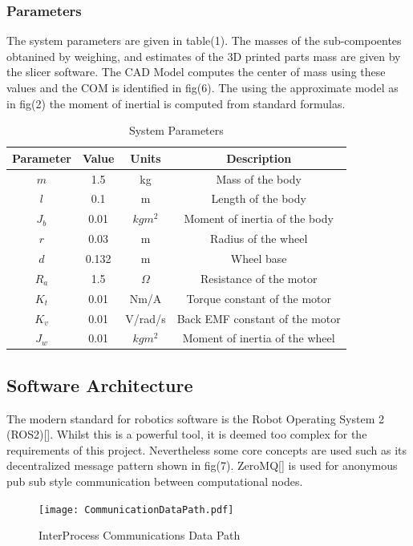         \pagebreak{}
        \subsubsection{Parameters }
        The system parameters are given in table(1). 
        The masses of the sub-compoentes obtanined by weighing,
        and estimates of the 3D printed parts mass are given by the slicer software. 
        The CAD Model computes the center of mass using these values and the COM is identified in fig(6).
        The using the approximate model as in fig(2) the moment of inertial is computed from standard formulas.
        \begin{table} [H]
            \centering
            \begin{tabular}{|c|c|c|c|}
                \hline
                Parameter & Value & Units & Description \\
                \hline
                $m$ & 1.5 & kg & Mass of the body \\
                $l$ & 0.1 & m & Length of the body \\
                $J_b$ & 0.01 & $kgm^2$ & Moment of inertia of the body \\
                $r$ & 0.03 & m & Radius of the wheel \\
                $d$ & 0.132 & m & Wheel base \\
                $R_a$ & 1.5 & $\Omega$ & Resistance of the motor \\
                $K_t$ & 0.01 & Nm/A & Torque constant of the motor \\
                $K_v$ & 0.01 & V/rad/s & Back EMF constant of the motor \\
                $J_w$ & 0.01 & $kgm^2$ & Moment of inertia of the wheel \\
                \hline
            \end{tabular}
            \caption{System Parameters}
        \end{table}

       
        
        \pagebreak{}
        \subsection{Software Architecture}
        The modern standard for robotics software is the Robot Operating System 2 (ROS2)[]. 
        Whilst this is a powerful tool, it is deemed too complex for the requirements of this project.
        Nevertheless some core concepts are used such as its 
        decentralized message pattern shown in fig(7). ZeroMQ[] is used for 
        anonymous pub sub style communication between computational nodes.
        \begin{figure} [H]
            \texttt{[image: CommunicationDataPath.pdf]}  
            \caption{InterProcess Communications Data Path}
        \end{figure}

